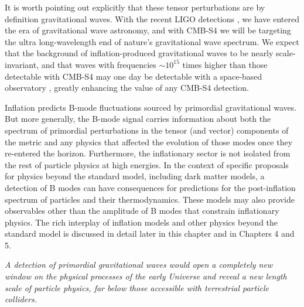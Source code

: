 It is worth pointing out explicitly that these tensor perturbations are by definition gravitational waves. With the recent LIGO detections \cite{Abbott:2016blz,Abbott:2016nmj}, we have entered the era of gravitational wave astronomy, and with CMB-S4 we will be targeting the ultra long-wavelength end of nature's gravitational wave spectrum. We expect that the background of inflation-produced gravitational waves to be nearly scale-invariant, and that waves with frequencies $\sim 10^{15}$ times higher than those detectable with CMB-S4 may one day be detectable with a space-based observatory \cite{Caligiuri:2014sla}, greatly enhancing the value of any CMB-S4 detection. 

Inflation predicts B-mode fluctuations sourced by primordial gravitational waves. But more generally, the B-mode signal carries information about both the spectrum of primordial perturbations in the tensor (and vector) components of the metric and any physics that affected the evolution of those modes once they re-entered the horizon. Furthermore, the inflationary sector is not isolated from the rest of particle physics at high energies. In the context of specific proposals for physics beyond the standard model, including dark matter models, a detection of B modes can have consequences for predictions for the post-inflation spectrum of particles and their thermodynamics. These models may also provide observables other than the amplitude of B modes that constrain inflationary physics. The rich interplay of inflation models and other physics beyond the standard model is discussed in detail later in this chapter and in Chapters 4 and 5.


{\it A detection of primordial gravitational waves would open a completely new window on the physical processes of the early Universe and reveal a new length scale of particle physics, far below those accessible with terrestrial particle colliders. }

